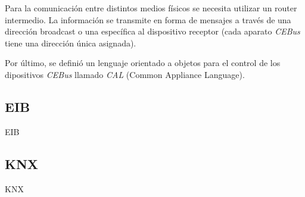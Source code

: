 Para la comunicación entre distintos medios físicos se necesita utilizar un router intermedio. La información se transmite en forma de mensajes a través de una dirección broadcast o una específica al dispositivo receptor (cada aparato \emph{CEBus} tiene una dirección única asignada).

Por último, se definió un lenguaje orientado a objetos para el control de los dipositivos \emph{CEBus} llamado \emph{CAL} (Common Appliance Language).

\subsection{EIB}

EIB

\subsection{KNX}

KNX